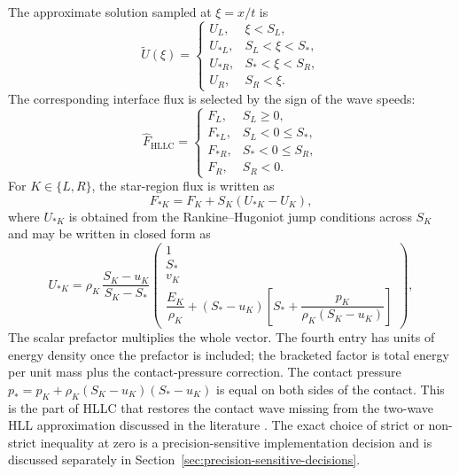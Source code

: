 The approximate solution sampled at \(\xi=x/t\) is
\begin{equation}\label{eq:ch3-hllc-sampled}
  \tilde U(\xi)=
  \begin{cases}
    U_L, & \xi<S_L,\\
    U_{\ast L}, & S_L<\xi<S_\ast,\\
    U_{\ast R}, & S_\ast<\xi<S_R,\\
    U_R, & S_R<\xi .
  \end{cases}
\end{equation}
The corresponding interface flux is selected by the sign of the wave speeds:
\begin{equation}\label{eq:ch3-hllc-fluxselect}
  \widehat F_{\mathrm{HLLC}}=
  \begin{cases}
    F_L, & S_L\ge 0,\\
    F_{\ast L}, & S_L<0\le S_\ast,\\
    F_{\ast R}, & S_\ast<0\le S_R,\\
    F_R, & S_R<0 .
  \end{cases}
\end{equation}
For \(K\in\{L,R\}\), the star-region flux is written as
\begin{equation}\label{eq:ch3-hllc-fstark}
  F_{\ast K}=F_K+S_K\left(U_{\ast K}-U_K\right),
\end{equation}
where \(U_{\ast K}\) is obtained from the Rankine--Hugoniot jump conditions
across \(S_K\) and may be written in closed form as
\begin{equation}\label{eq:ch3-hllc-ustark}
  U_{\ast K}
  =
  \rho_K\,\frac{S_K-u_K}{S_K-S_\ast}
  \begin{pmatrix}
    1\\[2pt]
    S_\ast\\[2pt]
    v_K\\[2pt]
    \dfrac{E_K}{\rho_K}
    +(S_\ast-u_K)\!\left[S_\ast+\dfrac{p_K}{\rho_K(S_K-u_K)}\right]
  \end{pmatrix},
\end{equation}
The scalar prefactor multiplies the whole vector. The fourth entry has units of energy density once the prefactor is included; the bracketed factor is total energy per unit mass plus the contact-pressure correction. The contact pressure
\(p_\ast=p_K+\rho_K(S_K-u_K)(S_\ast-u_K)\) is equal on both sides of the contact.
This is the part of HLLC that restores the contact wave missing from the
two-wave HLL approximation discussed in the literature
\citep{einfeldt_1988,toro_spruce_speares_1994,batten_etal_1997,toro2009}. The exact choice of strict or non-strict
inequality at zero is a precision-sensitive implementation decision and is
discussed separately in Section~\ref{sec:precision-sensitive-decisions}.

